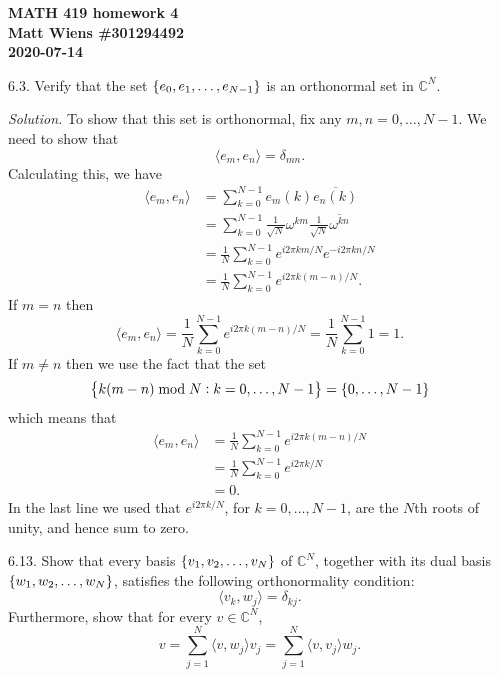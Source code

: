 \documentclass{article}
\newcommand{\C}{\mathbb{C}}
\begin{document}
\textbf{MATH 419 homework 4} \\
\textbf{Matt Wiens \#301294492} \\
\textbf{2020-07-14}

6.3. Verify that the set $\cbr{e_0, e_1, \ldots, e_{N - 1}}$
is an orthonormal set in $\C^N$.

\textit{Solution.}
To show that this set is orthonormal, fix any
$m, n = 0, \ldots, N - 1$. We need to show that
%
\begin{equation*}
    \langle e_m, e_n \rangle = \delta_{m n}
    .
\end{equation*}
%
Calculating this, we have
%
\begin{align*}
    \langle e_m, e_n \rangle
        &= \sum_{k = 0}^{N - 1} e_m(k) \overline{e_n(k)} \\
        &= \sum_{k = 0}^{N - 1} \frac{1}{\sqrt{N}} \omega^{km} \frac{1}{\sqrt{N}} \overline{\omega^{kn}} \\
        &= \frac{1}{N} \sum_{k = 0}^{N - 1} e^{i 2 \pi k m / N} e^{- i 2 \pi k n / N} \\
        &= \frac{1}{N} \sum_{k = 0}^{N - 1} e^{i 2 \pi k (m - n) / N}
        .
\end{align*}
%
If $m = n$ then
%
\begin{equation*}
    \langle e_m, e_n \rangle
        = \frac{1}{N} \sum_{k = 0}^{N - 1} e^{i 2 \pi k (m - n) / N}
        = \frac{1}{N} \sum_{k = 0}^{N - 1} 1
        = 1
        .
\end{equation*}
%
If $m \neq n$ then we use the fact that the set
%
\begin{equation*}
    \cbr{k (m - n) \bmod N: k = 0, \ldots, N - 1}
    = \cbr{0, \ldots, N - 1}
\end{equation*}
%
which means that
%
\begin{align*}
    \langle e_m, e_n \rangle
        &= \frac{1}{N} \sum_{k = 0}^{N - 1} e^{i 2 \pi k (m - n) / N} \\
        &= \frac{1}{N} \sum_{k = 0}^{N - 1} e^{i 2 \pi k / N} \\
        &= 0
        .
\end{align*}
%
In the last line we used that $e^{i 2 \pi k / N}$, for
$k = 0, \ldots, N - 1$, are the $N$th roots of unity, and hence sum to
zero.

\newpage

6.13. Show that every basis $\cbr{v_1, v_2, \ldots, v_N}$ of
$\C^N$, together with its dual basis $\cbr{w_1, w_2, \ldots, w_N}$,
satisfies the following orthonormality condition:
%
\begin{equation*}
    \langle v_k, w_j \rangle = \delta_{k j}
    .
\end{equation*}
%
Furthermore, show that for every $v \in \C^N$,
%
\begin{equation*}
    v
    = \sum_{j = 1}^N \langle v, w_j \rangle v_j
    = \sum_{j = 1}^N \langle v, v_j \rangle w_j
    .
\end{equation*}
\end{document}
